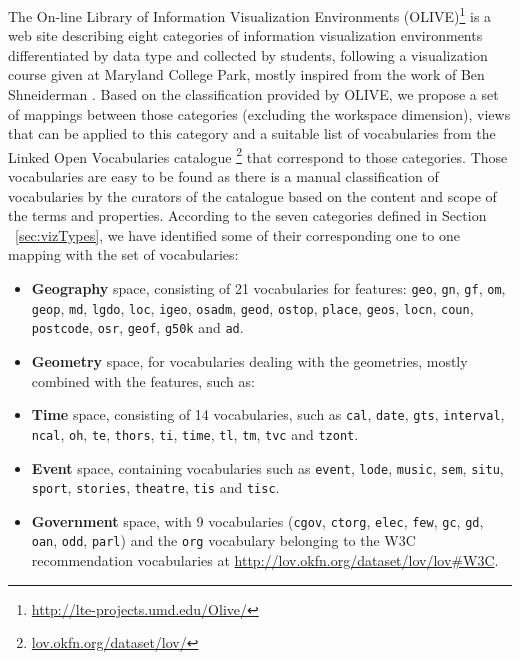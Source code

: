 The On-line Library of Information Visualization Environments (OLIVE)\footnote{\url{http://lte-projects.umd.edu/Olive/}} is a web site describing eight categories of information visualization environments differentiated by data type and collected by students, following a visualization course given at Maryland College Park, mostly inspired from the work of Ben Shneiderman \cite{Shneiderman99}. Based on the classification provided by OLIVE, we propose a set of mappings between those categories (excluding the workspace dimension), views that can be applied to this category and a suitable list of vocabularies from the Linked Open Vocabularies catalogue \cite{lov11}\footnote{\url{lov.okfn.org/dataset/lov/}} that correspond to those categories. Those vocabularies are easy to be found as there is a manual classification of vocabularies by the curators of the catalogue based on the content and scope of the terms and properties. According to the seven categories defined in Section ~\ref{sec:vizTypes}, we have identified some of their corresponding one to one mapping with the set of vocabularies:
 \begin{itemize}
 \item \textbf{Geography} space, consisting of 21 vocabularies for features: \texttt{geo}, \texttt{gn}, \texttt{gf}, \texttt{om}, \texttt{geop}, \texttt{md}, \texttt{lgdo}, \texttt{loc}, \texttt{igeo}, \texttt{osadm}, \texttt{geod}, \texttt{ostop}, \texttt{place}, \texttt{geos}, \texttt{locn}, \texttt{coun}, \texttt{postcode}, \texttt{osr}, \texttt{geof}, \texttt{g50k} and \texttt{ad}.
 \item \textbf{Geometry} space, for vocabularies dealing with the geometries, mostly combined with the features, such as: 
 \item \textbf{Time} space, consisting of 14 vocabularies, such as \texttt{cal}, \texttt{date}, \texttt{gts}, \texttt{interval}, \texttt{ncal}, \texttt{oh}, \texttt{te}, \texttt{thors}, \texttt{ti}, \texttt{time}, \texttt{tl}, \texttt{tm}, \texttt{tvc} and \texttt{tzont}. 
 \item \textbf{Event} space, containing vocabularies such  as \texttt{event}, \texttt{lode}, \texttt{music}, \texttt{sem}, \texttt{situ}, \texttt{sport}, \texttt{stories}, \texttt{theatre}, \texttt{tis} and \texttt{tisc}.
 \item \textbf{Government} space, with 9 vocabularies (\texttt{cgov}, \texttt{ctorg}, \texttt{elec}, \texttt{few}, \texttt{gc}, \texttt{gd}, \texttt{oan}, \texttt{odd}, \texttt{parl}) and the \texttt{org} vocabulary belonging to the W3C recommendation vocabularies at \url{ http://lov.okfn.org/dataset/lov/lov#W3C}.
 \end{itemize} 
